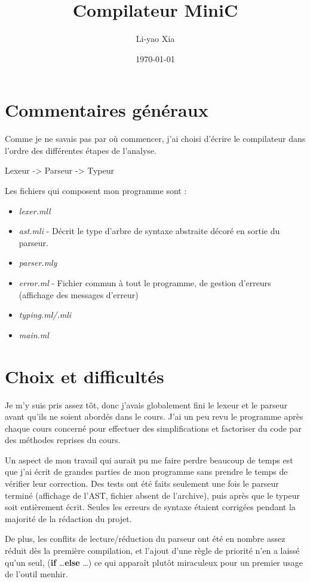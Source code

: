 \documentclass[a4paper]{article}
\begin{document}
\title{Compilateur MiniC}
\author{Li-yao Xia}
\date{\today}

\maketitle

\section{Commentaires généraux}

Comme je ne savais pas par où commencer,
j'ai choisi d'écrire le compilateur dans l'ordre des différentes étapes
de l'analyse. 

Lexeur -> Parseur -> Typeur

Les fichiers qui composent mon programme sont :
\begin{itemize}
  \item {\it lexer.mll}
  \item {\it ast.mli} - Décrit le type d'arbre de syntaxe abstraite décoré en
sortie du parseur.
  \item {\it parser.mly}
  \item {\it error.ml} - Fichier commun à tout le programme, de gestion
d'erreurs (affichage des messages d'erreur)
  \item {\it typing.ml/.mli}
  \item {\it main.ml}
\end{itemize}

\section{Choix et difficultés}

Je m'y suis pris assez tôt, donc j'avais globalement fini le
lexeur et le parseur avant qu'ils ne soient abordés dans le cours.
J'ai un peu revu le programme après chaque cours concerné pour effectuer
des simplifications et factoriser du code par des méthodes reprises du
cours. 

Un aspect de mon travail qui aurait pu me faire perdre beaucoup de temps est que 
j'ai écrit de grandes parties de mon programme sans prendre le temps de
vérifier leur correction. Des tests ont été faits seulement une fois le
parseur terminé (affichage de l'AST, fichier absent de l'archive), puis 
après que le typeur soit entièrement écrit.
Seules les erreurs de syntaxe étaient corrigées
pendant la majorité de la rédaction du projet. 

De plus, les conflits de lecture/réduction du parseur ont été en nombre
assez réduit dès la première compilation, et l'ajout d'une règle de
priorité n'en a laissé qu'un seul, ({\bf if} \dots {\bf else} \dots) 
ce qui apparaît plutôt miraculeux pour un premier usage de l'outil
menhir.
\end{document}
